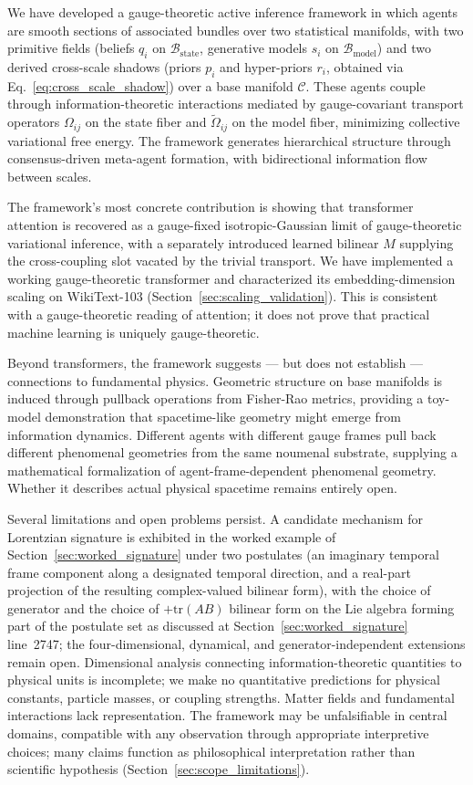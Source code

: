 \documentclass[11pt]{article}
\begin{document}
We have developed a gauge-theoretic active inference framework in which agents are smooth sections of associated bundles over two statistical manifolds, with two primitive fields (beliefs $q_i$ on $\mathcal{B}_{\mathrm{state}}$, generative models $s_i$ on $\mathcal{B}_{\mathrm{model}}$) and two derived cross-scale shadows (priors $p_i$ and hyper-priors $r_i$, obtained via Eq.~\eqref{eq:cross_scale_shadow}) over a base manifold $\mathcal{C}$. These agents couple through information-theoretic interactions mediated by gauge-covariant transport operators $\Omega_{ij}$ on the state fiber and $\tilde\Omega_{ij}$ on the model fiber, minimizing collective variational free energy. The framework generates hierarchical structure through consensus-driven meta-agent formation, with bidirectional information flow between scales.

The framework's most concrete contribution is showing that transformer attention is recovered as a gauge-fixed isotropic-Gaussian limit of gauge-theoretic variational inference, with a separately introduced learned bilinear $M$ supplying the cross-coupling slot vacated by the trivial transport. We have implemented a working gauge-theoretic transformer and characterized its embedding-dimension scaling on WikiText-103 (Section~\ref{sec:scaling_validation}). This is consistent with a gauge-theoretic reading of attention; it does not prove that practical machine learning is uniquely gauge-theoretic.

Beyond transformers, the framework suggests --- but does not establish --- connections to fundamental physics. Geometric structure on base manifolds is induced through pullback operations from Fisher-Rao metrics, providing a toy-model demonstration that spacetime-like geometry might emerge from information dynamics. Different agents with different gauge frames pull back different phenomenal geometries from the same noumenal substrate, supplying a mathematical formalization of agent-frame-dependent phenomenal geometry. Whether it describes actual physical spacetime remains entirely open.

Several limitations and open problems persist. A candidate mechanism for Lorentzian signature is exhibited in the worked example of Section~\ref{sec:worked_signature} under two postulates (an imaginary temporal frame component along a designated temporal direction, and a real-part projection of the resulting complex-valued bilinear form), with the choice of generator and the choice of $+\mathrm{tr}(AB)$ bilinear form on the Lie algebra forming part of the postulate set as discussed at Section~\ref{sec:worked_signature} line~2747; the four-dimensional, dynamical, and generator-independent extensions remain open. Dimensional analysis connecting information-theoretic quantities to physical units is incomplete; we make no quantitative predictions for physical constants, particle masses, or coupling strengths. Matter fields and fundamental interactions lack representation. The framework may be unfalsifiable in central domains, compatible with any observation through appropriate interpretive choices; many claims function as philosophical interpretation rather than scientific hypothesis (Section~\ref{sec:scope_limitations}).
\end{document}
